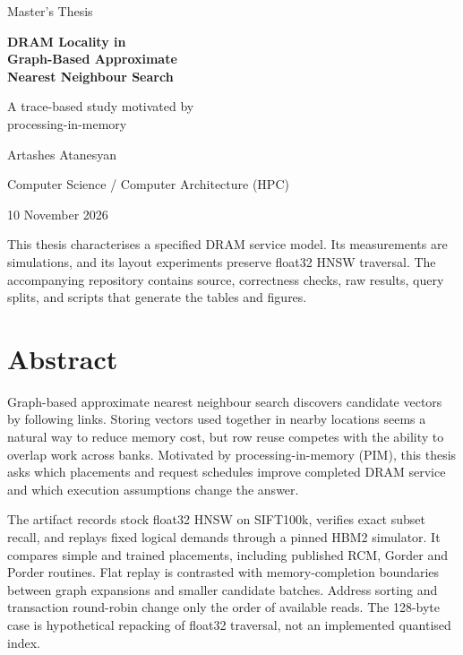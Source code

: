 \documentclass[11pt,a4paper]{report}
\begin{document}
\hypersetup{pageanchor=false}
\begin{titlepage}
\centering
\vspace*{2cm}
{\large Master's Thesis\par}
\vspace{1.2cm}
{\Huge\bfseries DRAM Locality in\\Graph-Based Approximate\\Nearest Neighbour Search\par}
\vspace{1cm}
{\Large\color{accent} A trace-based study motivated by\\processing-in-memory\par}
\vspace{2cm}
{\large Artashes Atanesyan\par}
{Computer Science / Computer Architecture (HPC)\par}
\vfill
{10 November 2026\par}
\vspace{0.6cm}
\begin{minipage}{0.88\textwidth}\small
This thesis characterises a specified DRAM service model. Its measurements are simulations, and its layout experiments preserve float32 HNSW traversal. The accompanying repository contains source, correctness checks, raw results, query splits, and scripts that generate the tables and figures.
\end{minipage}
\end{titlepage}
\hypersetup{pageanchor=true}
\chapter*{Abstract}
Graph-based approximate nearest neighbour search discovers candidate vectors by following links. Storing vectors used together in nearby locations seems a natural way to reduce memory cost, but row reuse competes with the ability to overlap work across banks. Motivated by processing-in-memory (PIM), this thesis asks which placements and request schedules improve completed DRAM service and which execution assumptions change the answer.

The artifact records stock float32 HNSW on SIFT100k, verifies exact subset recall, and replays fixed logical demands through a pinned HBM2 simulator. It compares simple and trained placements, including published RCM, Gorder and Porder routines. Flat replay is contrasted with memory-completion boundaries between graph expansions and smaller candidate batches. Address sorting and transaction round-robin change only the order of available reads. The 128-byte case is hypothetical repacking of float32 traversal, not an implemented quantised index.
\end{document}
